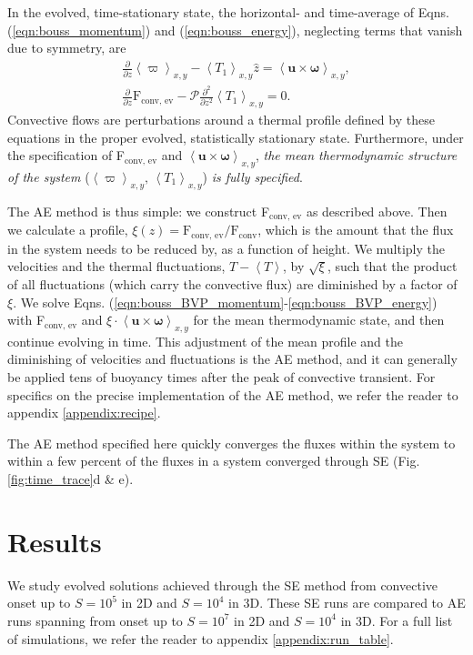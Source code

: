 \documentclass[aps, pre, onecolumn, nofootinbib, notitlepage, groupedaddress, amsfonts, amssymb, amsmath, longbibliography]{revtex4-1}
\newcommand{\angles}[1]{\ensuremath{\left\langle #1 \right\rangle}}
\begin{document}
In the evolved, time-stationary state, the horizontal- and time-average of
Eqns. (\ref{eqn:bouss_momentum}) and (\ref{eqn:bouss_energy}), neglecting terms that
vanish due to symmetry, are
\begin{gather}
\frac{\partial}{\partial z}\angles{\varpi}_{x,y} - \angles{T_1}_{x,y}\hat{z} = \angles{\bm{u}\times\bm{\omega}}_{x,y},
	\label{eqn:bouss_BVP_momentum}
\\
\frac{\partial}{\partial z}\text{F}_{\text{conv, ev}} - \mathcal{P}\frac{\partial^2}{\partial z^2} \angles{T_1}_{x,y} = 0.
	\label{eqn:bouss_BVP_energy}
\end{gather}
Convective flows
are perturbations around a thermal profile defined by these equations in the proper evolved, 
statistically stationary state. Furthermore, under the specification of
F$_{\text{conv, ev}}$ and $\angles{\bm{u}\times\bm{\omega}}_{x,y}$,
\emph{the mean thermodynamic structure of the system} ($\angles{\varpi}_{x,y},\,\angles{T_1}_{x,y}$)
\emph{is fully specified}.

The AE method is thus simple: we construct F$_{\text{conv, ev}}$ as described above.
Then we calculate a profile, 
$\xi(z) = \text{F}_{\text{conv, ev}}/\text{F}_{\text{conv}}$, which is the amount that the
flux in the system needs to be reduced by, as a function of height.
We multiply the velocities
and the thermal fluctuations, $T - \angles{T}$, by $\sqrt{\xi}$, such that the product of all fluctuations
(which carry the convective flux) are diminished by a factor of $\xi$.  We solve
Eqns. (\ref{eqn:bouss_BVP_momentum}-\ref{eqn:bouss_BVP_energy}) with F$_{\text{conv, ev}}$
and $\xi\cdot\angles{\bm{u}\times\bm{\omega}}_{x,y}$ for the mean thermodynamic state,
and then continue evolving in time.  This adjustment of the mean profile and the
diminishing of velocities and fluctuations is the AE method, and it can generally
be applied tens of buoyancy times after the peak of convective transient.
For specifics on the precise implementation of the AE method, we refer
the reader to appendix \ref{appendix:recipe}.

The AE method specified here quickly converges the fluxes within the
system to within a few percent of the fluxes in a system converged through
SE (Fig. \ref{fig:time_trace}d \& e).



\section{Results}
\label{sec:results}
We study evolved solutions achieved through the SE method from convective onset
up to $S = 10^5$ in 2D and $S = 10^4$ in 3D.  These SE runs are compared to
AE runs spanning from onset up to $S = 10^7$ in 2D and $S = 10^4$ in 3D.
For a full list of simulations, we refer the reader to appendix \ref{appendix:run_table}.
\end{document}
